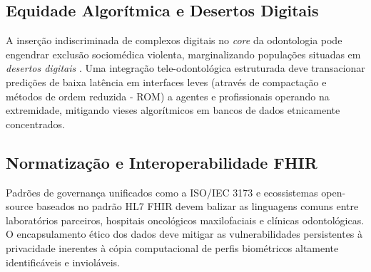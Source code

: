 \subsection{Equidade Algorítmica e Desertos Digitais}
A inserção indiscriminada de complexos digitais no \textit{core} da odontologia pode engendrar exclusão sociomédica violenta, marginalizando populações situadas em \textit{desertos digitais} \cite{katsoulakis2024digital}. Uma integração tele-odontológica estruturada deve transacionar predições de baixa latência em interfaces leves (através de compactação e métodos de ordem reduzida - ROM) a agentes e profissionais operando na extremidade, mitigando vieses algorítmicos em bancos de dados etnicamente concentrados.

\subsection{Normatização e Interoperabilidade FHIR}
Padrões de governança unificados como a ISO/IEC 3173 e ecossistemas open-source baseados no padrão HL7 FHIR devem balizar as linguagens comuns entre laboratórios parceiros, hospitais oncológicos maxilofaciais e clínicas odontológicas. O encapsulamento ético dos dados deve mitigar as vulnerabilidades persistentes à privacidade inerentes à cópia computacional de perfis biométricos altamente identificáveis e invioláveis.
